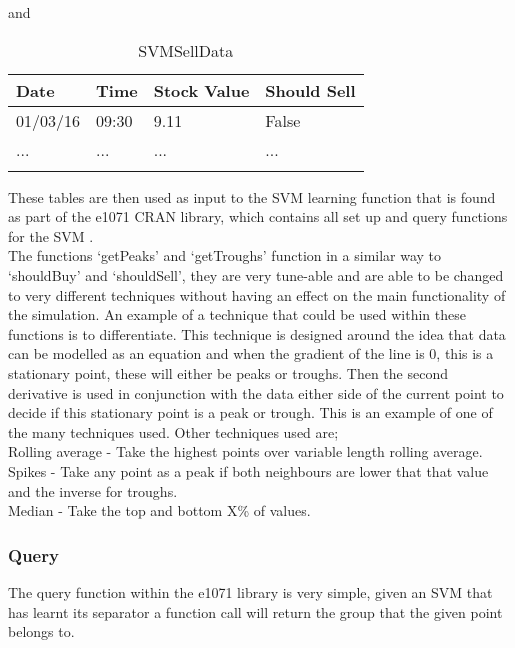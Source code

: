 \documentclass[12pt,a4paper]{article}
\begin{document}
and

\label{units}
\begin{longtable}{ |p{2.25cm}|p{2.25cm}|p{2.25cm}|p{2.25cm}| }\hline\hline
Date & Time & Stock Value & Should Sell \\ \hline
01/03/16 & 09:30 & 9.11 & False  \\ \hline
... & ... & ... & ...  \\ \hline
\caption{SVMSellData}
\end{longtable}

These tables are then used as input to the SVM learning function that is found as part of the e1071 CRAN library, which contains all set up and query functions for the SVM \cite{Meyer2017}.\\

The functions `getPeaks' and `getTroughs' function in a similar way to `shouldBuy' and `shouldSell', they are very tune-able and are able to be changed to very different techniques without having an effect on the main functionality of the simulation. An example of a technique that could be used within these functions is to differentiate. This technique is designed around the idea that data can be modelled as an equation and when the gradient of the line is 0, this is a stationary point, these will either be peaks or troughs. Then the second derivative is used in conjunction with the data either side of the current point to decide if this stationary point is a peak or trough. This is an example of one of the many techniques used. Other techniques used are; \\

\noindent
Rolling average - Take the highest points over variable length rolling average. \\
Spikes - Take any point as a peak if both neighbours are lower that that value and the inverse for troughs. \\
Median - Take the top and bottom X\% of values. 

\subsubsection{Query}

The query function within the e1071 library is very simple, given an SVM that has learnt its separator a function call will return the group that the given point belongs to.
\end{document}
